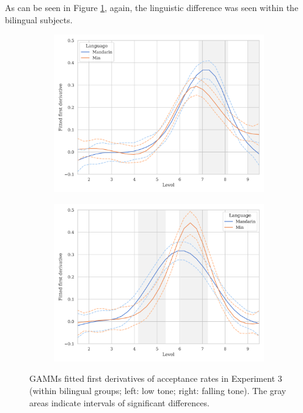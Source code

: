As can be seen in Figure \ref{Figure:E3GAMM_bilingual}, again, the linguistic difference was seen within the bilingual subjects.

\begin{figure}[hbt!]
\centering
\begin{subfigure}[b]{.45\textwidth}
\centering
\includegraphics[width=\textwidth]{figures/E3/Tone21_speed_GAMM_bilingual.png}
\end{subfigure}
\hfill
\begin{subfigure}[b]{.45\textwidth}
\centering
\includegraphics[width=\textwidth]{figures/E3/Tone51_speed_GAMM_bilingual.png}
\end{subfigure}
\caption{GAMMs fitted first derivatives of acceptance rates in Experiment 3 (within bilingual groups; left: low tone; right: falling tone). The gray areas indicate intervals of significant differences.}
\label{Figure:E3GAMM_bilingual}
\end{figure}

